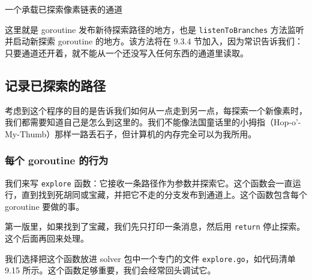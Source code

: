 \begin{codeannotations}
\item 一个承载已探索像素链表的通道
\end{codeannotations}

这里就是 goroutine 发布新待探索路径的地方，也是 \texttt{listenToBranches} 方法监听并启动新探索 goroutine 的地方。该方法将在 9.3.4 节加入，因为常识告诉我们：只要通道还开着，就不能从一个还没写入任何东西的通道里读取。

\subsection{记录已探索的路径}

考虑到这个程序的目的是告诉我们如何从一点走到另一点，每探索一个新像素时，我们都需要知道自己是怎么到这里的。我们不能像法国童话里的小拇指（Hop-o'-My-Thumb）那样一路丢石子，但计算机的内存完全可以为我所用。

\subsubsection*{每个 goroutine 的行为}

我们来写 \texttt{explore} 函数：它接收一条路径作为参数并探索它。这个函数会一直运行，直到找到死胡同或宝藏，并把它不走的分支发布到通道上。这个函数包含每个 goroutine 要做的事。

第一版里，如果找到了宝藏，我们先只打印一条消息，然后用 \texttt{return} 停止探索。这个后面再回来处理。

我们选择把这个函数放进 solver 包中一个专门的文件 \texttt{explore.go}，如代码清单 9.15 所示。这个函数足够重要，我们会经常回头调试它。

